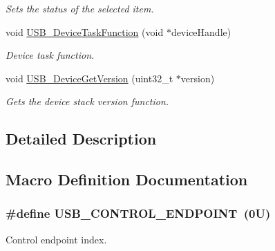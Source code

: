 \begin{DoxyCompactItemize}
\begin{DoxyCompactList}\small\item\em Sets the status of the selected item. \end{DoxyCompactList}\item 
void \hyperlink{group__usb__device__driver_gaceb8a5ec117d2dc22c2d2e2454bd84f7}{U\-S\-B\-\_\-\-Device\-Task\-Function} (void $\ast$device\-Handle)
\begin{DoxyCompactList}\small\item\em Device task function. \end{DoxyCompactList}\item 
void \hyperlink{group__usb__device__driver_gac3473781f5ef58f17635183b65e9cf62}{U\-S\-B\-\_\-\-Device\-Get\-Version} (uint32\-\_\-t $\ast$version)
\begin{DoxyCompactList}\small\item\em Gets the device stack version function. \end{DoxyCompactList}\end{DoxyCompactItemize}


\subsection{Detailed Description}


\subsection{Macro Definition Documentation}
\hypertarget{group__usb__device__driver_gac35db57970e61e674baba9eb53aa7a8c}{
\subsubsection[{U\-S\-B\-\_\-\-C\-O\-N\-T\-R\-O\-L\-\_\-\-E\-N\-D\-P\-O\-I\-N\-T}]{\setlength{\rightskip}{0pt plus 5cm}\#define U\-S\-B\-\_\-\-C\-O\-N\-T\-R\-O\-L\-\_\-\-E\-N\-D\-P\-O\-I\-N\-T~(0\-U)}}\label{group__usb__device__driver_gac35db57970e61e674baba9eb53aa7a8c}


Control endpoint index. 

